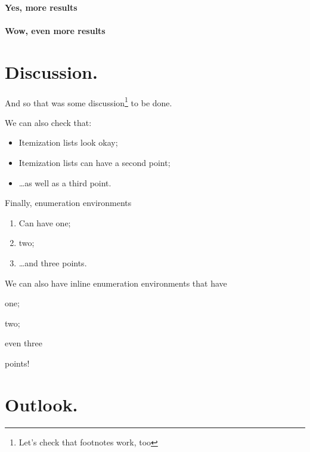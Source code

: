 \documentclass[
    papertype=a4paper,
]{phfextendedabstract}
\begin{document}
\paragraph{Yes, more results}
\lipsum[6]

\paragraph{Wow, even more results}
\lipsum[7-9]

\section{Discussion.}
\lipsum[8]

And so that was some discussion\footnote{Let's check that footnotes work, too} to be done.

We can also check that:
\begin{itemize}
\item Itemization lists look okay;
\item Itemization lists can have a second point;
\item \ldots as well as a third point.
\end{itemize}

Finally, enumeration environments
\begin{enumerate}
\item Can have one;
\item two;
\item \ldots and three points.
\end{enumerate}

We can also have inline enumeration environments that have
\begin{enumerate*}[label=\textbf{(\roman*)},itemjoin*={{ \ldots\ and }}]
\item one;
\item two;
\item even three
\end{enumerate*}
points!


\section{Outlook.}
\lipsum[9]
\end{document}
